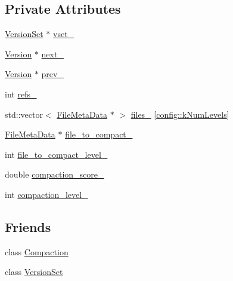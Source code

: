 \subsection*{Private Attributes}
\begin{DoxyCompactItemize}
\item 
\hyperlink{classleveldb_1_1_version_set}{Version\-Set} $\ast$ \hyperlink{classleveldb_1_1_version_ab27cb3e1215e4b948fbee011203098b4}{vset\-\_\-}
\item 
\hyperlink{classleveldb_1_1_version}{Version} $\ast$ \hyperlink{classleveldb_1_1_version_acd5135c980959de4ebb23e73269848f4}{next\-\_\-}
\item 
\hyperlink{classleveldb_1_1_version}{Version} $\ast$ \hyperlink{classleveldb_1_1_version_a78f5343161662289e86f9d53c5995833}{prev\-\_\-}
\item 
int \hyperlink{classleveldb_1_1_version_aa59ecbf976d0d28966892c93c8d8c634}{refs\-\_\-}
\item 
std\-::vector$<$ \hyperlink{structleveldb_1_1_file_meta_data}{File\-Meta\-Data} $\ast$ $>$ \hyperlink{classleveldb_1_1_version_a5ca95bbe4ddd4770c70405e4fa39616f}{files\-\_\-} \mbox{[}\hyperlink{namespaceleveldb_1_1config_ab6017947ae68898c606643bddc0f5b9c}{config\-::k\-Num\-Levels}\mbox{]}
\item 
\hyperlink{structleveldb_1_1_file_meta_data}{File\-Meta\-Data} $\ast$ \hyperlink{classleveldb_1_1_version_a2a5c6635d4043415889d2bff1251eabd}{file\-\_\-to\-\_\-compact\-\_\-}
\item 
int \hyperlink{classleveldb_1_1_version_ad141df0d8723b154c4dc7fe283529636}{file\-\_\-to\-\_\-compact\-\_\-level\-\_\-}
\item 
double \hyperlink{classleveldb_1_1_version_ab7194e4f85adf9ca5e933db556bbd572}{compaction\-\_\-score\-\_\-}
\item 
int \hyperlink{classleveldb_1_1_version_ac2edc27f49f9da2c35890e8ec7ada2c1}{compaction\-\_\-level\-\_\-}
\end{DoxyCompactItemize}
\subsection*{Friends}
\begin{DoxyCompactItemize}
\item 
class \hyperlink{classleveldb_1_1_version_a9372e882b35d27c78356228e4b758917}{Compaction}
\item 
class \hyperlink{classleveldb_1_1_version_a1827cd1b4d6e9e3c378ce37ca3cce635}{Version\-Set}
\end{DoxyCompactItemize}


